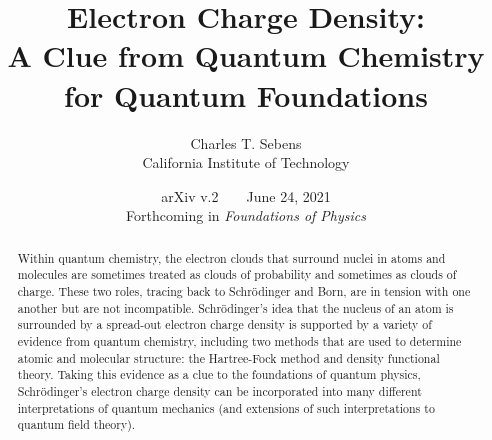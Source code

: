 \documentclass[onecolumn,secnumarabic,amsmath,amssymb,balancelastpage,nofootinbib]{article}
\begin{document}
\sloppy %



\newlength{\bibitemsep}\setlength{\bibitemsep}{.2\baselineskip plus .05\baselineskip minus .05\baselineskip}
\newlength{\bibparskip}\setlength{\bibparskip}{0pt}
\let\oldthebibliography\thebibliography
\renewcommand\thebibliography[1]{%
  \oldthebibliography{#1}%
  \setlength{\parskip}{\bibitemsep}%
  \setlength{\itemsep}{\bibparskip}%
}



\title{\vspace*{-44 pt}\Huge{Electron Charge Density:}\\\huge{A Clue from Quantum Chemistry\\for Quantum Foundations}}
\author{Charles T. Sebens\\California Institute of Technology}
\date{\vspace*{-6 pt}arXiv v.2\ \ \ \ June 24, 2021\vspace*{10 pt}\\Forthcoming in \textit{Foundations of Physics}}



\maketitle
\vspace*{-20 pt}
\begin{abstract}	
Within quantum chemistry, the electron clouds that surround nuclei in atoms and molecules are sometimes treated as clouds of probability and sometimes as clouds of charge.  These two roles, tracing back to Schr\"{o}dinger and Born, are in tension with one another but are not incompatible.  Schr\"{o}dinger's idea that the nucleus of an atom is surrounded by a spread-out electron charge density is supported by a variety of evidence from quantum chemistry, including two methods that are used to determine atomic and molecular structure: the Hartree-Fock method and density functional theory.  Taking this evidence as a clue to the foundations of quantum physics, Schr\"{o}dinger's electron charge density can be incorporated into many different interpretations of quantum mechanics (and extensions of such interpretations to quantum field theory).
\end{abstract}
\end{document}
